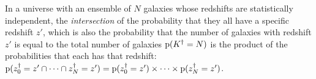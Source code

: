\begin{definition}\label{def:intersection}
    In a universe with an ensemble of $N$ galaxies whose redshifts are statistically independent, the \textit{intersection} of the probability that they all have a specific redshift $z'$, which is also the probability that the number of galaxies with redshift $z'$ is equal to the total number of galaxies ${\mathrm{p}(K^{\dagger} = N)}$ is the product of the probabilities that each has that redshift: ${\mathrm{p}(z^{\dagger}_{0} = z' \cap \dots \cap z^{\dagger}_{N} = z') = \mathrm{p}(z^{\dagger}_{0} = z') \times \dots \times \mathrm{p}(z^{\dagger}_{N} = z')}$.
\end{definition}





